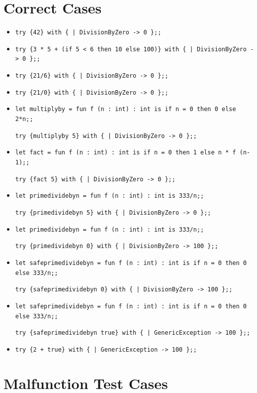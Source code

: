 \documentclass{article}
\begin{document}
\section*{Correct Cases}

\begin{itemize}
  \item \texttt{try \{42\} with \{ | DivisionByZero -> 0 \};;}
  \item \texttt{try \{3 * 5 + (if 5 < 6 then 10 else 100)\} with \{ | DivisionByZero -> 0 \};;}
  \item \texttt{try \{21/6\} with \{ | DivisionByZero -> 0 \};;}
  \item \texttt{try \{21/0\} with \{ | DivisionByZero -> 0 \};;}
  \item \texttt{let multiplyby = fun f (n : int) : int is if n = 0 then 0 else 2*n;;}

        \texttt{try \{multiplyby 5\} with \{ | DivisionByZero -> 0 \};;}
  \item \texttt{let fact = fun f (n : int) : int is if n = 0 then 1 else n * f (n-1);;}

        \texttt{try \{fact 5\} with \{ | DivisionByZero -> 0 \};;}
  \item \texttt{let primedividebyn = fun f (n : int) : int is 333/n;;}

        \texttt{try \{primedividebyn 5\} with \{ | DivisionByZero -> 0 \};;}
  \item \texttt{let primedividebyn = fun f (n : int) : int is 333/n;;}

        \texttt{try \{primedividebyn 0\} with \{ | DivisionByZero -> 100 \};;}
  \item \texttt{let safeprimedividebyn = fun f (n : int) : int is if n = 0 then 0 else 333/n;;}

        \texttt{try \{safeprimedividebyn 0\} with \{ | DivisionByZero -> 100 \};;}
  \item \texttt{let safeprimedividebyn = fun f (n : int) : int is if n = 0 then 0 else 333/n;;}

        \texttt{try \{safeprimedividebyn true\} with \{ | GenericException -> 100 \};;}
  \item \texttt{try \{2 + true\} with \{ | GenericException -> 100 \};;}
\end{itemize}

\section*{Malfunction Test Cases}
\end{document}
